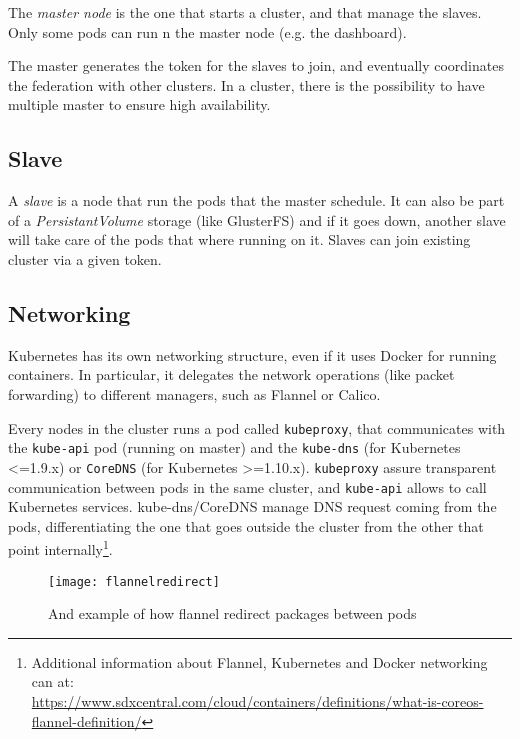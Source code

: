 The \emph{master node} is the one that starts a cluster, and that manage the
slaves. Only some pods can run n the master node (e.g. the dashboard).

The master generates the token for the slaves to join, and eventually
coordinates the federation with other clusters. In a cluster, there is the
possibility to have multiple master to ensure high availability.

\subsection{Slave}\label{slave}

A \emph{slave} is a node that run the pods that the master schedule. It can
also be part of a \emph{PersistantVolume} storage (like GlusterFS) and if it
goes down, another slave will take care of the pods that where running on
it. Slaves can join existing cluster via a given token.

\subsection{Networking}\label{networking}

Kubernetes has its own networking structure, even if it uses Docker for running
containers. In particular, it delegates the network operations (like packet
forwarding) to different managers, such as Flannel or Calico.

Every nodes in the cluster runs a pod called \texttt{kubeproxy}, that
communicates with the \texttt{kube-api} pod (running on master) and
the \texttt{kube-dns} (for Kubernetes \textless{}=1.9.x) or
\texttt{CoreDNS} (for Kubernetes \textgreater{}=1.10.x). \texttt{kubeproxy}
assure transparent communication between pods in the same cluster, and
\texttt{kube-api} allows to call Kubernetes services. kube-dns/CoreDNS manage
DNS request coming from the pods, differentiating the one that goes outside
the cluster from the other that point internally\footnote{Additional
information about Flannel, Kubernetes and Docker networking
can at:\\
\sloppy
\url{https://www.sdxcentral.com/cloud/containers/definitions/what-is-coreos-flannel-definition/}}.

\begin{figure}[htbp]
\centering
\texttt{[image: flannelredirect]}
\caption{And example of how flannel redirect packages between pods}
\end{figure}



